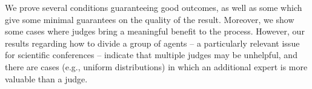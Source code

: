 \documentclass[letterpaper]{article} %
\newcommand{\omer}[1]{\textcolor{purple}{Omer says: #1}}
\newcommand{\nick}[1]{\todo[color=kentuckyblue!40,size=footnotesize]{Nick says: #1}}
\newcommand{\nickin}[1]{\todo[color=kentuckyblue!40,inline]{Nick says: #1}}
\begin{document}
We prove several conditions guaranteeing good outcomes, as well as some which give some minimal guarantees on the quality of the result. Moreover, we show some cases where judges bring a meaningful benefit to the process. However, our results regarding how to divide a group of agents -- a particularly relevant issue for scientific conferences -- indicate that multiple judges may be unhelpful, and there are cases (e.g., uniform distributions) in which an additional expert is more valuable than a judge. %



\end{document}
